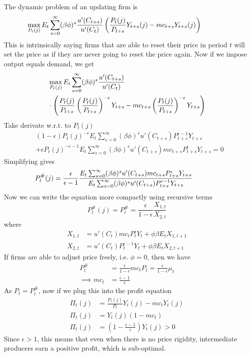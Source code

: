 \documentclass[twocolumn, fleqn]{article}
\begin{document}
	The dynamic problem of an updating firm is 
	\begin{align*}
		\hspace{-28pt}&\max_{P_t(j)} E_t \sum_{s=0}^{\infty} (\beta \phi)^s \frac{u'(C_{t+s})}{u'(C_t)} \left( \frac{P_t(j)}{P_{t+s}} Y_{t+s}(j)  - mc_{t+s} Y_{t+s}(j) \right) \notag 
	\end{align*}
	This is intrinsically saying firms that are able to reset their price in period $t$ will set the price as if they are never going to reset the price again. Now if we impose output equals demand, we get
	\begin{align*}
		&\max_{P_t(j)} E_t \sum_{s=0}^{\infty} (\beta \phi)^s \frac{u'(C_{t+s})}{u'(C_t)} \\
		&\cdot\left( \frac{P_t(j)}{P_{t+s}} \left( \frac{P_t(j)}{P_{t+s}} \right)^{-\epsilon} Y_{t+s} - mc_{t+s} \left( \frac{P_t(j)}{P_{t+s}} \right)^{-\epsilon} Y_{t+s} \right) \notag 
	\end{align*}
	Take derivate w.r.t. to $P_t(j)$
	\begin{align*}
		&(1 - \epsilon) P_t(j)^{-\epsilon} E_t \sum_{s=0}^{\infty} (\beta \phi)^s u'(C_{t+s}) P_{t+s}^{\epsilon-1} Y_{t+s} \\
		&+ \epsilon P_t(j)^{-\epsilon-1} E_t \sum_{s=0}^{\infty} (\beta \phi)^s u'(C_{t+s}) mc_{t+s} P_{t+s}^{\epsilon} Y_{t+s} = 0
	\end{align*}
	Simplifying gives 
	\begin{align*}
		\hspace{-28pt}P_t^\#(j) &= \frac{\epsilon}{\epsilon - 1} \frac{E_t \sum_{s=0}^{\infty} (\beta \phi)^s u'(C_{t+s}) mc_{t+s} P_{t+s}^{\epsilon} Y_{t+s}}{E_t \sum_{s=0}^{\infty} (\beta \phi)^s u'(C_{t+s}) P_{t+s}^{\epsilon-1} Y_{t+s}}
	\end{align*}
	Now we can write the equation more compactly using recursive terms
	\begin{equation}
		P_t^\#(j) = P_t^\# = \frac{\epsilon}{1-\epsilon}\frac{X_{1,t}}{X_{2,t}}
	\end{equation}
	where 
	\begin{align}
		X_{1,t} &= u'(C_t) mc_t P_t^{\epsilon} Y_t + \phi \beta E_t X_{1,t+1}  \\
		X_{2,t} &= u'(C_t) P_t^{\epsilon-1} Y_t + \phi \beta E_t X_{2,t+1}
	\end{align}
	If firms are able to adjust price freely, i.e. $\phi=0$, then we have
	\begin{align*}
		P_t^\# &= \frac{\epsilon}{1-\epsilon} mc_t P_t = \frac{\epsilon}{1-\epsilon} \mu_t\\
		\implies mc_t &= \frac{\epsilon-1}{\epsilon}
	\end{align*}
	As $P_t = P_t^\#$, now if we plug this into the profit equation
	\begin{align*}
		\Pi_t(j) &= \frac{P_t(j)}{P_t}Y_t(j) - mc_t Y_t(j)\\
		\Pi_t(j) &= Y_t(j)(1-mc_t)\\
		\Pi_t(j) &= \left(1- \frac{\epsilon-1}{\epsilon}\right)Y_t(j)>0
	\end{align*}
	Since $\epsilon>1$, this means that even when there is no price rigidity, intermediate producers earn a positive profit, which is sub-optimal.
	
\end{document}
